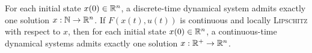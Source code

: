 \begin{theorem}
    For each initial state $x(0) \in \mathbb{R}^n$, a discrete-time dynamical system admits exactly one solution $x :\mathbb{N} \rightarrow \mathbb{R}^n$. If $F(x(t), u(t))$ is continuous and locally \textsc{Lipschitz} with respect to $x$, then for each initial state $x(0) \in \mathbb{R}^n$, a continuous-time dynamical systems admits exactly one solution $x : \mathbb{R}^+ \to \mathbb{R}^n$.
\end{theorem}